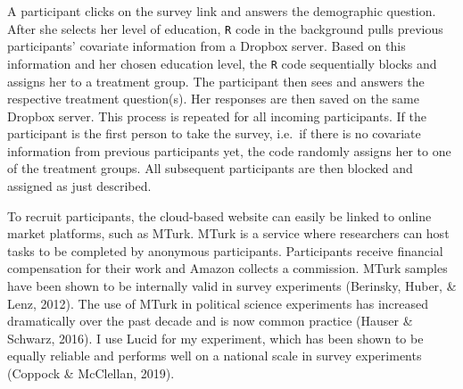 \documentclass[12pt,econ]{sources/authesis}
\makeatletter
\def\caption{\refstepcounter\@captype \@dblarg{\@caption\@captype}}
\makeatother
\begin{document}
\vspace{0.8cm}
\begin{figure}[ht]
\centering
{}
\caption{Online survey experiment workflow} \label{online-workflow}
\end{figure}
A participant clicks on the survey link and answers the demographic question. After she selects her level of education, \texttt{R} code in the background pulls previous participants' covariate information from a Dropbox server. Based on this information and her chosen education level, the \texttt{R} code sequentially blocks and assigns her to a treatment group. The participant then sees and answers the respective treatment question(s). Her responses are then saved on the same Dropbox server. This process is repeated for all incoming participants. If the participant is the first person to take the survey, i.e.~if there is no covariate information from previous participants yet, the code randomly assigns her to one of the treatment groups. All subsequent participants are then blocked and assigned as just described.

To recruit participants, the cloud-based website can easily be linked to online market platforms, such as MTurk. MTurk is a service where researchers can host tasks to be completed by anonymous participants. Participants receive financial compensation for their work and Amazon collects a commission. MTurk samples have been shown to be internally valid in survey experiments (Berinsky, Huber, \& Lenz, 2012). The use of MTurk in political science experiments has increased dramatically over the past decade and is now common practice (Hauser \& Schwarz, 2016). I use Lucid for my experiment, which has been shown to be equally reliable and performs well on a national scale in survey experiments (Coppock \& McClellan, 2019).
\end{document}
